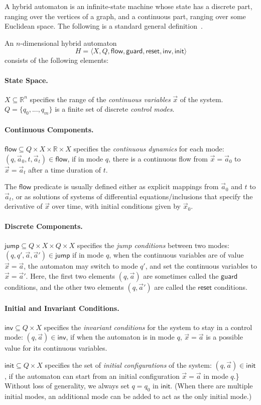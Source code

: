 \documentclass[envcountsect]{llncs}
\newcommand{\flow}{\mathsf{flow}}
\newcommand{\jump}{\mathsf{jump}}
\newcommand{\inv}{\mathsf{inv}}
\newcommand{\init}{\mathsf{init}}
\newcommand{\guard}{\mathsf{guard}}
\newcommand{\reset}{\mathsf{reset}}
\newcommand{\R}{\mathbb{R}}
\begin{document}
A hybrid automaton is an infinite-state machine whose state has a discrete part,
 ranging over the vertices of a graph, and a continuous part, ranging over some
Euclidean space.  The following is a standard general definition~\cite{}.
\begin{definition}\label{auto-def}
An $n$-dimensional hybrid automaton $$H   = \langle X, Q, \flow,
\guard, \reset, \inv, \init\rangle$$ consists of the following elements:
\paragraph{\bf State Space.} $X\subseteq \mathbb{R}^n$ specifies the range of
the {\em continuous variables}  $\vec x$ of the system. $Q=\{q_0,...,q_m\}$ is
a finite set of discrete {\em control modes}.

\paragraph{\bf Continuous Components.} $\flow \subseteq Q\times
X\times \R \times X$ specifies the {\em continuous dynamics}
for each mode: $(q, \vec a_0, t, \vec a_t)\in \flow$, if in mode $q$,
there is a continuous flow from $\vec x =\vec a_0$ to $\vec x = \vec a_t$
after a time duration of $t$.

The $\flow$ predicate is usually defined either as explicit mappings from
$\vec a_0$ and $t$ to $\vec a_t$,  or as solutions of systems of differential
equations/inclusions that specify the derivative of $\vec x$ over time, with
initial conditions given by $\vec x_0$.

\paragraph{\bf Discrete Components.} $\jump\subseteq Q\times
X\times Q\times X$ specifies the {\em jump conditions}
between two modes: $(q,q',\vec a,\vec a')\in \jump$ if in mode $q$,
when the continuous variables are of value $\vec x = \vec a$, the automaton may
switch to mode $q'$, and set the continuous variables to $\vec x = \vec
a'$.  Here, the first two elements $(q, \vec a)$ are sometimes called the
$\guard$ conditions, and the other two elements $(q, \vec a')$ are called the
$\reset$ conditions.

\paragraph{\bf Initial and Invariant Conditions.} $\inv \subseteq Q\times X$
specifies the {\em invariant conditions} for
the system to stay in a control mode: $(q,\vec a)\in \inv$, if when the
automaton is in mode $q$, $\vec x = \vec a$ is a possible value for its
continuous variables.

$\init \subseteq Q\times X$ specifies the set of {\em
initial configurations} of the system: $(q, \vec a)\in \init$, if the
automaton can start from an initial configuration $\vec x = \vec a$ in mode
$q$.\} Without loss of generality, we always set $q=q_0$ in $\init$. (When there
are multiple initial modes, an additional mode can be
added to act as the only initial mode.)
\end{definition}
\end{document}
